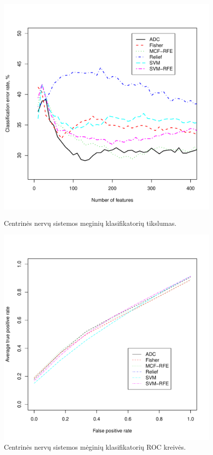 \begin{figure}[!htb]
\begin{minipage}[b]{0.5\linewidth}
\centering
\includegraphics[width=\textwidth]{../bachelor/images/nncns_classification.pdf}
\caption{Centrinės nervų sistemos meginių klasifikatorių tikslumas.}
\label{fig:class_cns}
\end{minipage}
\hspace{0.1cm}
\begin{minipage}[b]{0.5\linewidth}
\centering
\includegraphics[width=\textwidth]{../bachelor/images/nncns_roc.pdf}
\caption{Centrinės nervų sistemos mėginių klasifikatorių ROC kreivės.}
\label{fig:roc_cns}
\end{minipage}
\end{figure}

